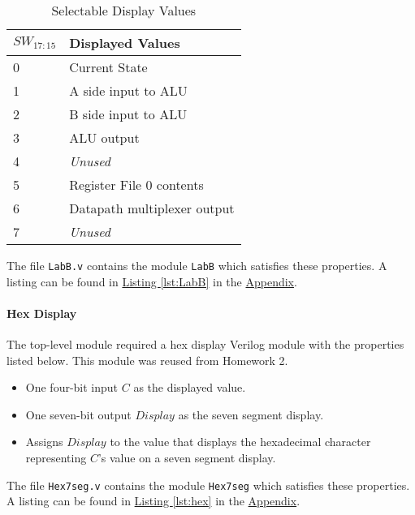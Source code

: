 \begin{table}[htbp] 
    \center
    \begin{tabular}{ll}                             \toprule
        $SW_{17:15}$    & Displayed Values              \\\midrule
        0               & Current State                 \\
        1               & A side input to ALU           \\
        2               & B side input to ALU           \\
        3               & ALU output                    \\
        4               & \emph{Unused}                 \\
        5               & Register File 0 contents      \\
        6               & Datapath multiplexer output   \\
        7               & \emph{Unused}                 \\\bottomrule
    \end{tabular}
\caption{Selectable Display Values\label{tab:display}}
\end{table}

The file \verb|LabB.v| contains the module \verb|LabB| which satisfies these properties.
A listing can be found in \hyperref[lst:LabB]{Listing \ref*{lst:LabB}} in the \hyperref[sec:appendix]{Appendix}.

\paragraph{Hex Display} \label{par:hex}

The top-level module required a hex display Verilog module with the properties listed below.
This module was reused from Homework 2.

\begin{itemize}
    \item One four-bit input $C$ as the displayed value.
    \item One seven-bit output $Display$ as the seven segment display.
    \item Assigns $Display$ to the value that displays the hexadecimal character representing $C$'s value on a seven segment display.
\end{itemize}

The file \verb|Hex7seg.v| contains the module \verb|Hex7seg| which satisfies these properties.
A listing can be found in \hyperref[lst:hex]{Listing \ref*{lst:hex}} in the \hyperref[sec:appendix]{Appendix}.

